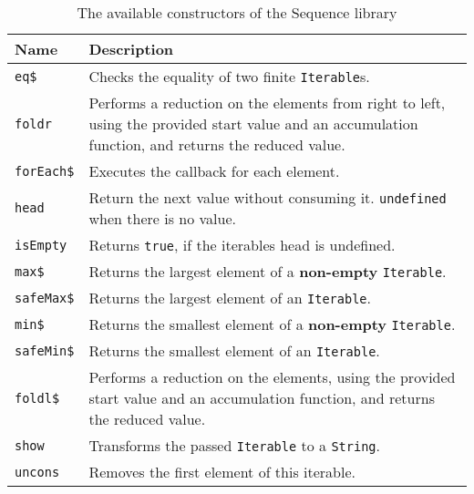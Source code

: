 \begin{table}[H]
  \centering
  \begin{tabularx}{\textwidth}{| l | X |} \hline
    \textbf{Name} & \textbf{Description} \\ \hline
    \texttt{eq\$} & Checks the equality of two finite \texttt{Iterable}s. \\ \hline 
    \texttt{foldr} & Performs a reduction on the elements from right to left, using the provided start value and an accumulation function, and returns the reduced value. \\ \hline 
    \texttt{forEach\$} & Executes the callback for each element. \\ \hline 
    \texttt{head} & Return the next value without consuming it. \texttt{undefined} when there is no value. \\ \hline 
    \texttt{isEmpty} & Returns \texttt{true}, if the iterables head is undefined. \\ \hline 
    \texttt{max\$} & Returns the largest element of a \textbf{non-empty} \texttt{Iterable}. \\ \hline 
    \texttt{safeMax\$} & Returns the largest element of an \texttt{Iterable}. \\ \hline 
    \texttt{min\$} & Returns the smallest element of a \textbf{non-empty} \texttt{Iterable}. \\ \hline 
    \texttt{safeMin\$} & Returns the smallest element of an \texttt{Iterable}. \\ \hline 
    \texttt{foldl\$} & Performs a reduction on the elements, using the provided start value and an accumulation function, and returns the reduced value. \\ \hline 
    \texttt{show} & Transforms the passed \texttt{Iterable} to a \texttt{String}. \\ \hline 
    \texttt{uncons} & Removes the first element of this iterable. \\ \hline 
  \end{tabularx}
  \caption{The available constructors of the Sequence library}
  \label{tab:api_term_ops}
\end{table}


